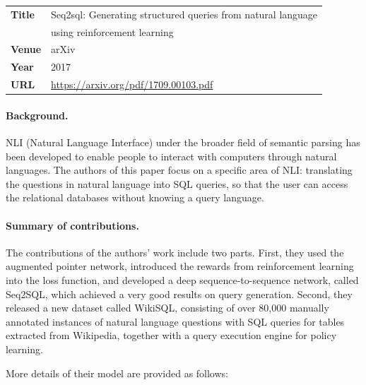 
\begin{table}[h]
    \centering
    \begin{tabular}{ll}
        \toprule
        \textbf{Title} & Seq2sql: Generating structured queries from natural language \\
        & using reinforcement learning\\
        \midrule
        \textbf{Venue} & arXiv \\
        \textbf{Year}  & 2017 \\
        \textbf{URL}   & \url{https://arxiv.org/pdf/1709.00103.pdf} \\
        \bottomrule
    \end{tabular}
    \vspace{1em}
\end{table}

\paragraph{Background.}
NLI (Natural Language Interface) under the broader field of semantic parsing has been developed to enable people to interact with computers through natural languages. The authors of this paper focus on a specific area of NLI: translating the questions in natural language into SQL queries, so that the user can access the relational databases without knowing a query language. 

\paragraph{Summary of contributions.}
The contributions of the authors' work include two parts. First, they used the augmented pointer network, introduced the rewards from reinforcement learning into the loss function, and developed a deep sequence-to-sequence network, called Seq2SQL, which achieved a very good results on query generation. Second, they released a new dataset called WikiSQL, consisting of over 80,000 manually annotated instances of natural language questions with SQL queries for tables extracted from Wikipedia, together with a query execution engine for policy learning.

More details of their model are provided as follows:

